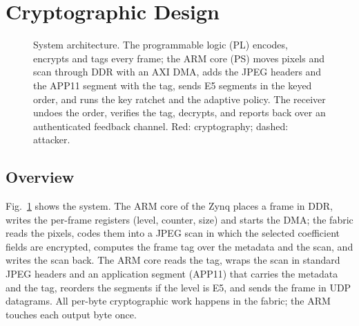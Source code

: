\section{Cryptographic Design}\label{sec:design}
\begin{figure}[t]
\centering
\resizebox{0.95\textwidth}{!}{}
\caption{System architecture. The programmable logic (PL) encodes, encrypts and tags every frame; the ARM core (PS) moves pixels and scan through DDR with an AXI DMA, adds the JPEG headers and the APP11 segment with the tag, sends E5 segments in the keyed order, and runs the key ratchet and the adaptive policy. The receiver undoes the order, verifies the tag, decrypts, and reports back over an authenticated feedback channel. Red: cryptography; dashed: attacker.}
\label{fig:system}
\end{figure}

\subsection{Overview}
Fig.~\ref{fig:system} shows the system. The ARM core of the Zynq places a frame in DDR, writes the per-frame registers (level, counter, size) and starts the DMA; the fabric reads the pixels, codes them into a JPEG scan in which the selected coefficient fields are encrypted, computes the frame tag over the metadata and the scan, and writes the scan back. The ARM core reads the tag, wraps the scan in standard JPEG headers and an application segment (APP11) that carries the metadata and the tag, reorders the segments if the level is E5, and sends the frame in UDP datagrams. All per-byte cryptographic work happens in the fabric; the ARM touches each output byte once.

